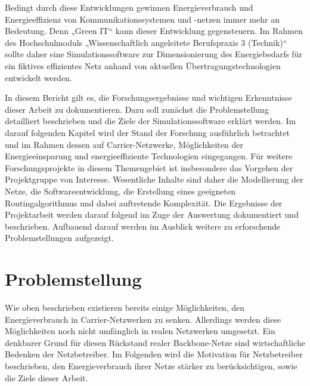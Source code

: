 \documentclass[12pt,titlepage]{article}
\begin{document}
 
Bedingt durch diese Entwicklungen gewinnen Energieverbrauch und Energieeffizienz von Kommunikationssystemen und -netzen immer mehr an Bedeutung. Denn „Green IT“ kann dieser Entwicklung gegensteuern. Im Rahmen des Hochschulmoduls „Wissenschaftlich angeleitete Berufspraxis 3 (Technik)“ sollte daher eine Simulationssoftware zur Dimensionierung des Energiebedarfs für ein fiktives effizientes Netz anhand von aktuellen Übertragungstechnologien entwickelt werden. 


In diesem Bericht gilt es, die Forschungsergebnisse und wichtigen Erkenntnisse dieser Arbeit zu dokumentieren. Dazu soll zunächst die Problemstellung detailliert beschrieben und die Ziele der Simulationssoftware erklärt werden. Im darauf folgenden Kapitel wird der Stand der Forschung ausführlich betrachtet und im Rahmen dessen auf Carrier-Netzwerke, Möglichkeiten der Energieeinsparung und energieeffiziente Technologien eingegangen. Für weitere Forschungsprojekte in diesem Themengebiet ist insbesondere das Vorgehen der Projektgruppe von Interesse. Wesentliche Inhalte sind daher die Modellierung der Netze, die Softwareentwicklung, die Erstellung eines geeigneten Routingalgorithmus und dabei auftretende Komplexität. Die Ergebnisse der Projektarbeit werden darauf folgend im Zuge der Auswertung dokumentiert und beschrieben. Aufbauend darauf werden im Ausblick weitere zu erforschende Problemstellungen aufgezeigt. 



\section{Problemstellung}
Wie oben beschrieben existieren bereits einige Möglichkeiten, den Energieverbrauch in Carrier-Netzwerken zu senken. Allerdings werden diese Möglichkeiten noch nicht umfänglich in realen Netzwerken umgesetzt. Ein denkbarer Grund für diesen Rückstand realer Backbone-Netze sind wirtschaftliche Bedenken der Netzbetreiber. Im Folgenden wird die Motivation für Netzbetreiber beschrieben, den Energieverbrauch ihrer Netze stärker zu berücksichtigen, sowie die Ziele dieser Arbeit.
\end{document}
